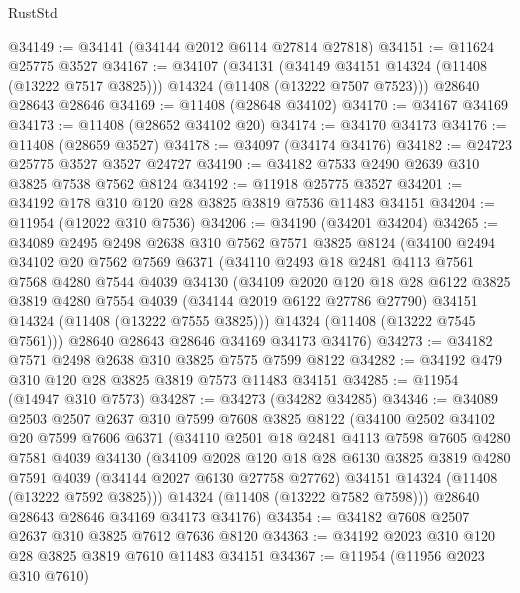 \begin{lexlean}{RustStd}
\begin{coremodule}
@34149 := @34141 (@34144 @2012 @6114 @27814 @27818)
@34151 := @11624 @25775 @3527
@34167 := @34107
    (@34131
      (@34149 @34151 @14324 (@11408 (@13222 @7517 @3825)))
      @14324
      (@11408 (@13222 @7507 @7523)))
    @28640
    @28643
    @28646
@34169 := @11408 (@28648 @34102)
@34170 := @34167 @34169
@34173 := @11408 (@28652 @34102 @20)
@34174 := @34170 @34173
@34176 := @11408 (@28659 @3527)
@34178 := @34097 (@34174 @34176)
@34182 := @24723 @25775 @3527 @3527 @24727
@34190 := @34182 @7533 @2490 @2639 @310 @3825 @7538 @7562 @8124
@34192 := @11918 @25775 @3527
@34201 := @34192 @178 @310 @120 @28 @3825 @3819 @7536 @11483 @34151
@34204 := @11954 (@12022 @310 @7536)
@34206 := @34190 (@34201 @34204)
@34265 := @34089
    @2495
    @2498
    @2638
    @310
    @7562
    @7571
    @3825
    @8124
    (@34100
      @2494
      @34102
      @20
      @7562
      @7569
      @6371
      (@34110
        @2493
        @18
        @2481
        @4113
        @7561
        @7568
        @4280
        @7544
        @4039
        @34130
        (@34109
          @2020
          @120
          @18
          @28
          @6122
          @3825
          @3819
          @4280
          @7554
          @4039
          (@34144 @2019 @6122 @27786 @27790)
          @34151
          @14324
          (@11408 (@13222 @7555 @3825)))
        @14324
        (@11408 (@13222 @7545 @7561)))
      @28640
      @28643
      @28646
      @34169
      @34173
      @34176)
@34273 := @34182 @7571 @2498 @2638 @310 @3825 @7575 @7599 @8122
@34282 := @34192 @479 @310 @120 @28 @3825 @3819 @7573 @11483 @34151
@34285 := @11954 (@14947 @310 @7573)
@34287 := @34273 (@34282 @34285)
@34346 := @34089
    @2503
    @2507
    @2637
    @310
    @7599
    @7608
    @3825
    @8122
    (@34100
      @2502
      @34102
      @20
      @7599
      @7606
      @6371
      (@34110
        @2501
        @18
        @2481
        @4113
        @7598
        @7605
        @4280
        @7581
        @4039
        @34130
        (@34109
          @2028
          @120
          @18
          @28
          @6130
          @3825
          @3819
          @4280
          @7591
          @4039
          (@34144 @2027 @6130 @27758 @27762)
          @34151
          @14324
          (@11408 (@13222 @7592 @3825)))
        @14324
        (@11408 (@13222 @7582 @7598)))
      @28640
      @28643
      @28646
      @34169
      @34173
      @34176)
@34354 := @34182 @7608 @2507 @2637 @310 @3825 @7612 @7636 @8120
@34363 := @34192 @2023 @310 @120 @28 @3825 @3819 @7610 @11483 @34151
@34367 := @11954 (@11956 @2023 @310 @7610)

\end{coremodule}
\end{lexlean}
